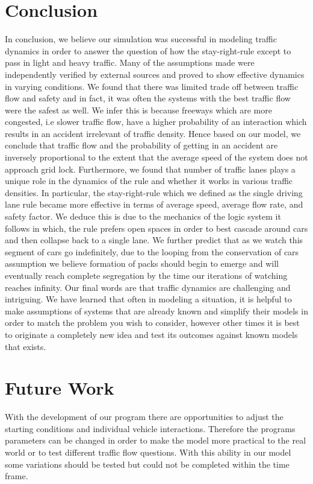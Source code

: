 \documentclass{amsart}
\begin{document}
\section{\bfseries{Conclusion}}
	In conclusion, we believe our simulation was successful in modeling traffic dynamics in order to answer the question of how the stay-right-rule except to pass in light and heavy traffic. Many of the assumptions made were independently verified by external sources and proved to show effective dynamics in varying conditions. We found that there was limited trade off between traffic flow and safety and in fact, it was often the systems with the best traffic flow were the safest as well. We infer this is because freeways which are more congested, i.e slower traffic flow, have a higher probability of an interaction which results in an accident irrelevant of traffic density. Hence based on our model, we conclude that traffic flow and the probability of getting in an accident are inversely proportional to the extent that the average speed of the system does not approach grid lock. Furthermore, we found that number of traffic lanes plays a unique role in the dynamics of the rule and whether it works in various traffic densities. In particular, the stay-right-rule which we defined as the single driving lane rule became more effective in terms of average speed, average flow rate, and safety factor. We deduce this is due to the mechanics of the logic system it follows in which, the rule prefers open spaces in order to best cascade around cars and then collapse back to a single lane. We further predict that as we watch this segment of cars go indefinitely, due to the looping from the conservation of cars assumption we believe formation of packs should begin to emerge and will eventually reach complete segregation by the time our iterations of watching reaches infinity. Our final words are that traffic dynamics are challenging and intriguing. We have learned that often in modeling a situation, it is helpful to make assumptions of systems that are already known and simplify their models in order to match the problem you wish to consider, however other times it is best to originate a completely new idea and test its outcomes against known models that exists. 
	

	
	


\section{\bfseries{Future Work}}
	With the development of our program there are opportunities to adjust the starting conditions and individual vehicle interactions.  Therefore the programs parameters can be changed in order to make the model more practical to the real world or to test different traffic flow questions.  With this ability in our model some variations should be tested but could not be completed within the time frame.  
\end{document}
